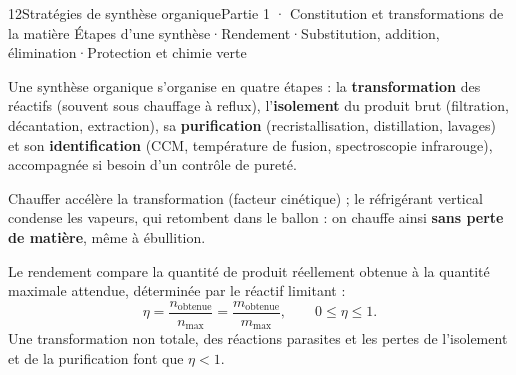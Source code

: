 \begin{ouverture}[synthese]{12}{Stratégies de synthèse organique}{Partie 1 · Constitution et transformations de la matière}
{Étapes d'une synthèse\enspace·\enspace Rendement\enspace·\enspace Substitution, addition, élimination\enspace·\enspace Protection et chimie verte}
\end{ouverture}
\essentiel
{}
\begin{definition}
Une synthèse organique s'organise en quatre étapes : la \textbf{transformation} des réactifs (souvent sous chauffage à
reflux), l'\textbf{isolement} du produit brut (filtration, décantation, extraction), sa \textbf{purification}
(recristallisation, distillation, lavages) et son \textbf{identification} (CCM, température de fusion, spectroscopie
infrarouge), accompagnée si besoin d'un contrôle de pureté.
\end{definition}
\begin{propriete}
Chauffer accélère la transformation (facteur cinétique) ; le réfrigérant vertical condense les vapeurs, qui retombent
dans le ballon : on chauffe ainsi \textbf{sans perte de matière}, même à ébullition.
\end{propriete}
\begin{definition}
Le rendement compare la quantité de produit réellement obtenue à la quantité maximale attendue, déterminée par le
réactif limitant :
\[\eta=\frac{n_{\text{obtenue}}}{n_{\max}}=\frac{m_{\text{obtenue}}}{m_{\max}},\qquad 0\leq\eta\leq1.\]
Une transformation non totale, des réactions parasites et les pertes de l'isolement et de la purification font que
$\eta<1$.
\end{definition}
